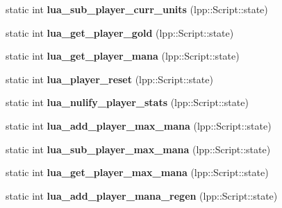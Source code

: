 \begin{DoxyCompactItemize}
\item 
static int {\bfseries lua\+\_\+sub\+\_\+player\+\_\+curr\+\_\+units} (lpp\+::\+Script\+::state)\hypertarget{class_lua_interface_addb1d5db4d04c80752ace4ef7a010b0d}{}\label{class_lua_interface_addb1d5db4d04c80752ace4ef7a010b0d}

\item 
static int {\bfseries lua\+\_\+get\+\_\+player\+\_\+gold} (lpp\+::\+Script\+::state)\hypertarget{class_lua_interface_a5abf544661b26908794eeb511772cf9b}{}\label{class_lua_interface_a5abf544661b26908794eeb511772cf9b}

\item 
static int {\bfseries lua\+\_\+get\+\_\+player\+\_\+mana} (lpp\+::\+Script\+::state)\hypertarget{class_lua_interface_aa3939950ae6cfc3b45115f440bfd290d}{}\label{class_lua_interface_aa3939950ae6cfc3b45115f440bfd290d}

\item 
static int {\bfseries lua\+\_\+player\+\_\+reset} (lpp\+::\+Script\+::state)\hypertarget{class_lua_interface_a1d8d26a4f46a2d91856e11efbe8076db}{}\label{class_lua_interface_a1d8d26a4f46a2d91856e11efbe8076db}

\item 
static int {\bfseries lua\+\_\+nulify\+\_\+player\+\_\+stats} (lpp\+::\+Script\+::state)\hypertarget{class_lua_interface_a6d51975d8c88e24f5c0ad89965ae8758}{}\label{class_lua_interface_a6d51975d8c88e24f5c0ad89965ae8758}

\item 
static int {\bfseries lua\+\_\+add\+\_\+player\+\_\+max\+\_\+mana} (lpp\+::\+Script\+::state)\hypertarget{class_lua_interface_a50a8fcd9b22eba4fd808e13a673fe898}{}\label{class_lua_interface_a50a8fcd9b22eba4fd808e13a673fe898}

\item 
static int {\bfseries lua\+\_\+sub\+\_\+player\+\_\+max\+\_\+mana} (lpp\+::\+Script\+::state)\hypertarget{class_lua_interface_ad2ad746cbf223bd06349dfab1320207c}{}\label{class_lua_interface_ad2ad746cbf223bd06349dfab1320207c}

\item 
static int {\bfseries lua\+\_\+get\+\_\+player\+\_\+max\+\_\+mana} (lpp\+::\+Script\+::state)\hypertarget{class_lua_interface_a65d049c5048af5ce0586e92b1c97863c}{}\label{class_lua_interface_a65d049c5048af5ce0586e92b1c97863c}

\item 
static int {\bfseries lua\+\_\+add\+\_\+player\+\_\+mana\+\_\+regen} (lpp\+::\+Script\+::state)\hypertarget{class_lua_interface_a6fdf838f910868e113ac05dcbed31f7a}{}\label{class_lua_interface_a6fdf838f910868e113ac05dcbed31f7a}


\end{DoxyCompactItemize}
